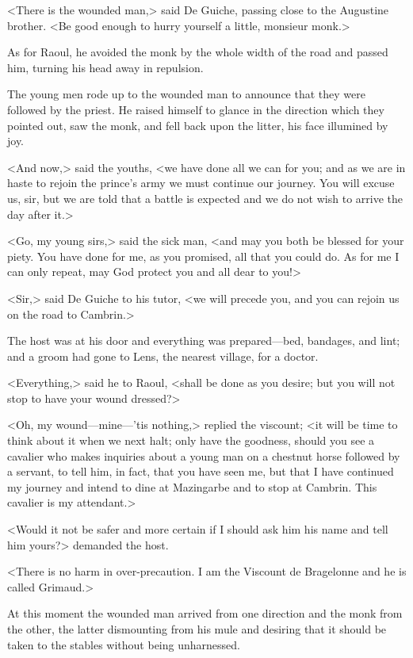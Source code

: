 <There is the wounded man,> said De Guiche, passing close to the Augustine brother. <Be good enough to hurry yourself a little, monsieur monk.>

As for Raoul, he avoided the monk by the whole width of the road and passed him, turning his head away in repulsion.

The young men rode up to the wounded man to announce that they were followed by the priest. He raised himself to glance in the direction which they pointed out, saw the monk, and fell back upon the litter, his face illumined by joy.

<And now,> said the youths, <we have done all we can for you; and as we are in haste to rejoin the prince's army we must continue our journey. You will excuse us, sir, but we are told that a battle is expected and we do not wish to arrive the day after it.>

<Go, my young sirs,> said the sick man, <and may you both be blessed for your piety. You have done for me, as you promised, all that you could do. As for me I can only repeat, may God protect you and all dear to you!>

<Sir,> said De Guiche to his tutor, <we will precede you, and you can rejoin us on the road to Cambrin.>

The host was at his door and everything was prepared—bed, bandages, and lint; and a groom had gone to Lens, the nearest village, for a doctor.

<Everything,> said he to Raoul, <shall be done as you desire; but you will not stop to have your wound dressed?>

<Oh, my wound—mine—'tis nothing,> replied the viscount; <it will be time to think about it when we next halt; only have the goodness, should you see a cavalier who makes inquiries about a young man on a chestnut horse followed by a servant, to tell him, in fact, that you have seen me, but that I have continued my journey and intend to dine at Mazingarbe and to stop at Cambrin. This cavalier is my attendant.>

<Would it not be safer and more certain if I should ask him his name and tell him yours?> demanded the host.

<There is no harm in over-precaution. I am the Viscount de Bragelonne and he is called Grimaud.>

At this moment the wounded man arrived from one direction and the monk from the other, the latter dismounting from his mule and desiring that it should be taken to the stables without being unharnessed.


